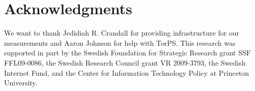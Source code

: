 \section*{Acknowledgments}
We want to thank Jedidiah R. Crandall for providing infrastructure for our
measurements and Aaron Johnson for help with TorPS.
%
This research was supported in part by the Swedish Foundation for Strategic
Research grant SSF FFL09-0086, the Swedish Research Council grant VR 2009-3793,
the Swedish Internet Fund, 
and the Center for Information Technology Policy at Princeton University.
